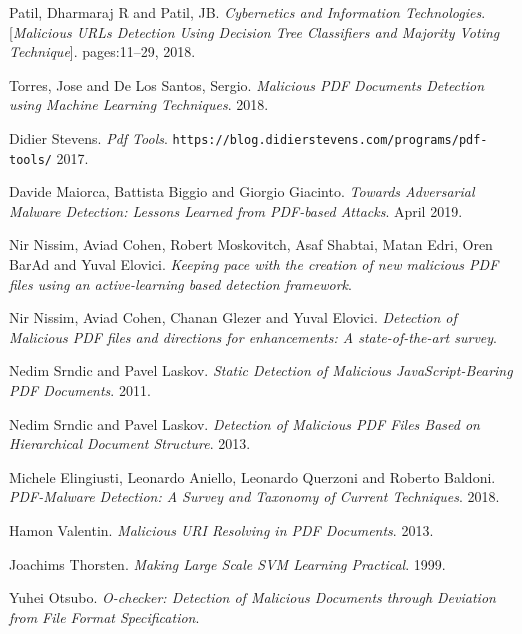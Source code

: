 \documentclass{article}
\begin{document}
\begin{thebibliography}{9}
Patil, Dharmaraj R and Patil, JB. 
\textit{Cybernetics and Information Technologies}.
[\textit{Malicious URLs Detection Using Decision Tree Classifiers and Majority Voting Technique}]. 
pages:11–29, 2018.

Torres, Jose and De Los Santos, Sergio. 
\textit{Malicious PDF Documents Detection using Machine Learning Techniques}. 
2018.
  
Didier Stevens.
\textit{Pdf Tools}. 
\texttt{https://blog.didierstevens.com/programs/pdf-tools/}
2017.

Davide Maiorca, Battista Biggio and Giorgio Giacinto. 
\textit{Towards Adversarial Malware Detection: Lessons Learned from PDF-based Attacks}. 
April 2019.

Nir Nissim, Aviad Cohen, Robert Moskovitch, Asaf Shabtai, Matan Edri, Oren BarAd and Yuval Elovici. 
\textit{Keeping pace with the creation of new malicious PDF files using an active-learning based detection framework}. 

Nir Nissim, Aviad Cohen, Chanan Glezer and Yuval Elovici. 
\textit{Detection of Malicious PDF files and directions for enhancements: A state-of-the-art survey}.                                             

Nedim Srndic and Pavel Laskov.
\textit{Static Detection of Malicious JavaScript-Bearing PDF Documents}.
2011.

Nedim Srndic and Pavel Laskov. 
\textit{Detection of Malicious PDF Files Based on Hierarchical Document Structure}.                                             
2013.

Michele Elingiusti, Leonardo Aniello, Leonardo Querzoni and Roberto Baldoni. 
\textit{PDF-Malware Detection: A Survey and Taxonomy of Current Techniques}.                                             
2018. 

Hamon Valentin. 
\textit{Malicious URI Resolving in PDF Documents}.                                             
2013.

Joachims Thorsten.
\textit{Making Large Scale SVM Learning Practical}.                                             
1999.

Yuhei Otsubo.
\textit{O-checker: Detection of Malicious Documents through Deviation from File Format Specification}. 


\end{thebibliography}
\end{document}
